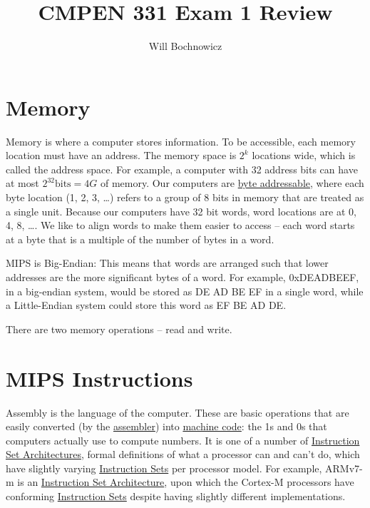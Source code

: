 \documentclass{article}
\title{CMPEN 331 Exam 1 Review}
\author{Will Bochnowicz}
\begin{document}
\maketitle

\tableofcontents

\section{Memory}

Memory is where a computer stores information. To be accessible, each memory location must have an address. The memory space is $2^k$ locations wide, which is called the address space. For example, a computer with 32 address bits can have at most $2^{32} \text{bits} = 4G$ of memory. Our computers are \underline{byte addressable}, where each byte location (1, 2, 3, \ldots) refers to a group of 8 bits in memory that are treated as a single unit. Because our computers have 32 bit words, word locations are at 0, 4, 8, \ldots. We like to align words to make them easier to access -- each word starts at a byte that is a multiple of the number of bytes in a word.

MIPS is Big-Endian: This means that words are arranged such that lower addresses are the more significant bytes of a word. For example, 0xDEADBEEF, in a big-endian system, would be stored as DE AD BE EF in a single word, while a Little-Endian system could store this word as EF BE AD DE.

There are two memory operations -- read and write. 

\section{MIPS Instructions}

Assembly is the language of the computer. These are basic operations that are easily converted (by the \underline{assembler}) into \underline{machine code}: the 1s and 0s that computers actually use to compute numbers. It is one of a number of \underline{Instruction Set Architectures}, formal definitions of what a processor can and can't do, which have slightly varying \underline{Instruction Sets} per processor model. For example, ARMv7-m is an \underline{Instruction Set Architecture}, upon which the Cortex-M processors have conforming \underline{Instruction Sets} despite having slightly different implementations. 
\end{document}
